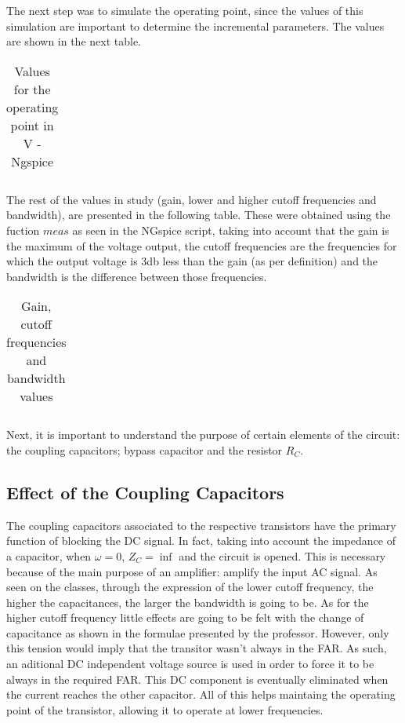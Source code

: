 \par The next step was to simulate the operating point, since the values of this simulation are important to determine the incremental parameters. The values are shown in the next table.

\begin{table}[H]
  \centering
  \begin{tabular}{|l|r|}
    \hline    
   
     \end{tabular}
  \caption{Values for the operating point in V - Ngspice}
  \label{tab:op}
    
\end{table}

\par The rest of the values in study (gain, lower and higher cutoff frequencies and bandwidth),  are presented in the following table. These were obtained using the fuction $meas$ as seen in the NGspice script, taking into account that the gain is the maximum of the voltage output, the cutoff frequencies are the frequencies for which the output voltage is 3db less than the gain (as per definition) and the bandwidth is the difference between those frequencies.

\begin{table}[H]
  \centering
  \begin{tabular}{|l|r|}
    \hline    
   
    \end{tabular}
  \caption{Gain, cutoff frequencies and bandwidth values}
    \label{tab:results}
\end{table}

\par Next, it is important to understand the purpose of certain elements of the circuit: the coupling capacitors; bypass capacitor and the resistor $R_C$. 

\subsection{Effect of the Coupling Capacitors}

\par The coupling capacitors associated to the respective transistors have the primary function of blocking the DC signal. In fact, taking into account the impedance of a capacitor, when $\omega=0$, $Z_C=\inf$ and the circuit is opened. This is necessary because of the main purpose of an amplifier: amplify the input AC signal. As seen on the classes, through the expression of the lower cutoff frequency, the higher the capacitances, the larger the bandwidth is going to be. As for the higher cutoff frequency little effects are going to be felt with the change of capacitance as shown in the formulae presented by the professor. However, only this tension would imply that the transitor wasn't always in the FAR. As such, an aditional DC independent voltage source is used in order to force it to be always in the required FAR. This DC component is eventually eliminated when the current reaches the other capacitor. All of this helps maintaing the operating point of the transistor, allowing it to operate at lower frequencies.

